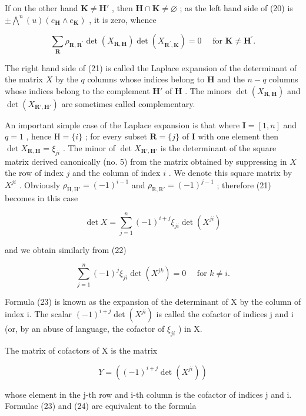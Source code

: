 If on the other hand \(\mathbf{K} \neq \mathbf{H}'\) , then \(\mathbf{H} \cap \mathbf{K} \neq \varnothing\) ; as the left hand side of (20) is \(\pm \bigwedge^{n}(u)(e_{\mathbf{H}} \wedge e_{\mathbf{K}})\) , it is zero, whence

\[
\sum_ {\mathbf {R}} \rho_ {\mathbf {R}, \mathbf {R} ^ {\prime}} \det (X _ {\mathbf {R}, \mathbf {H}}) \det (X _ {\mathbf {R} ^ {\prime}, \mathbf {K}}) = 0 \quad \text { for } \mathbf {K} \neq \mathbf {H} ^ {\prime}.\tag{22}
\]

The right hand side of (21) is called the Laplace expansion of the determinant of the matrix \(X\) by the \(q\) columns whose indices belong to \(\mathbf{H}\) and the \(n - q\) columns whose indices belong to the complement \(\mathbf{H}'\) of \(\mathbf{H}\) . The minors \(\det(X_{\mathbf{R},\mathbf{H}})\) and \(\det(X_{\mathbf{R}',\mathbf{H}'})\) are sometimes called complementary.

An important simple case of the Laplace expansion is that where \(\mathbf{I} = [1, n]\) and \(q = 1\) , hence \(\mathrm{H} = \{i\}\) ; for every subset \(\mathbf{R} = \{j\}\) of \(\mathbf{I}\) with one element then \(\det X_{\mathbf{R},\mathbf{H}} = \xi_{ji}\) . The minor of \(\det X_{\mathbf{R}',\mathbf{H}'}\) is the determinant of the square matrix derived canonically (no. 5) from the matrix obtained by suppressing in \(X\) the row of index \(j\) and the column of index \(i\) . We denote this square matrix by \(X^{ji}\) . Obviously \(\rho_{\mathrm{H},\mathrm{H}'} = (-1)^{i-1}\) and \(\rho_{\mathrm{R},\mathrm{R}'} = (-1)^{j-1}\) ; therefore (21) becomes in this case

\[
\det X = \sum_ {j = 1} ^ {n} (- 1) ^ {i + j} \xi_ {j i} \det (X ^ {j i})\tag{23}
\]

and we obtain similarly from (22)

\[
\sum_ {j = 1} ^ {n} (- 1) ^ {j} \xi_ {j i} \det (X ^ {j k}) = 0 \quad \text { for } k \neq i.\tag{24}
\]

Formula (23) is known as the expansion of the determinant of X by the column of index i. The scalar \((-1)^{i+j}\det(X^{ji})\) is called the cofactor of indices j and i (or, by an abuse of language, the cofactor of \(\xi_{ji}\) ) in X.

The matrix of cofactors of X is the matrix

\[
Y = ((- 1) ^ {i + j} \det (X ^ {j i}))\tag{25}
\]

whose element in the j-th row and i-th column is the cofactor of indices j and i. Formulae (23) and (24) are equivalent to the formula

